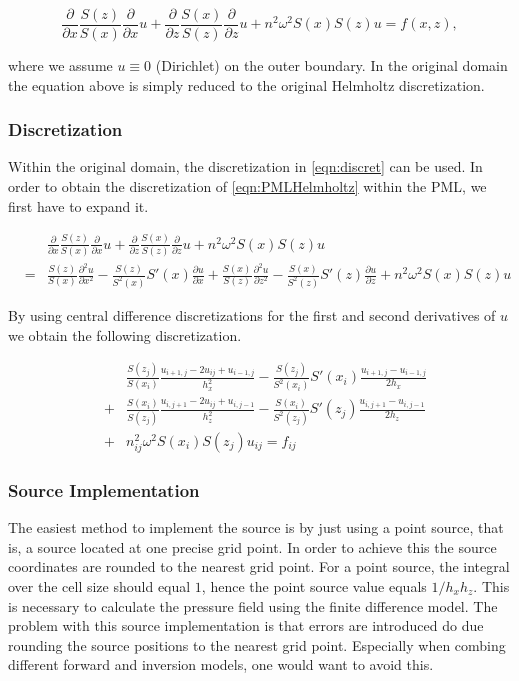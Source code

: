 \documentclass[10pt,a4paper]{article}
\begin{document}
\begin{equation} \label{eqn:PMLHelmholtz}
\frac{\partial }{\partial x}\frac{S(z)}{S(x)}\frac{\partial }{\partial x}u + \frac{\partial }{\partial z}\frac{S(x)}{S(z)}\frac{\partial }{\partial z}u + n^2\omega^2 S(x)S(z)u=f(x,z),
\end{equation}

where we assume $u\equiv 0$ (Dirichlet) on the outer boundary. In the original domain the equation above is simply reduced to the original Helmholtz discretization.

\subsubsection{Discretization}
Within the original domain, the discretization in \cref{eqn:discret} can be used. In order to obtain the discretization of \cref{eqn:PMLHelmholtz} within the PML, we first have to expand it. 

\begin{eqnarray}
&& \frac{\partial }{\partial x}\frac{S(z)}{S(x)}\frac{\partial }{\partial x}u + \frac{\partial }{\partial z}\frac{S(x)}{S(z)}\frac{\partial }{\partial z}u + n^2\omega^2 S(x)S(z)u\\
&=& \frac{S(z)}{S(x)}\frac{\partial^2 u}{\partial x^2}-\frac{S(z)}{S^2(x)}S'(x)\frac{\partial u}{\partial x} + \frac{S(x)}{S(z)}\frac{\partial^2 u}{\partial z^2}-\frac{S(x)}{S^2(z)}S'(z)\frac{\partial u}{\partial z}+ n^2\omega^2 S(x)S(z)u
\end{eqnarray}

By using central difference discretizations for the first and second derivatives of $u$ we obtain the following discretization.

\begin{eqnarray}
&&\frac{S(z_j)}{S(x_i)}\frac{u_{i+1,j}-2u_{ij}+u_{i-1,j}}{h_x^2}-\frac{S(z_j)}{S^2(x_i)}S'(x_i)\frac{u_{i+1,j}-u_{i-1,j}}{2h_x}\\
&+& \frac{S(x_i)}{S(z_j)}\frac{u_{i,j+1}-2u_{ij}+u_{i,j-1}}{h_z^2}-\frac{S(x_i)}{S^2(z_j)}S'(z_j)\frac{u_{i,j+1}-u_{i,j-1}}{2h_z}\\
&+& n_{ij}^2\omega^2 S(x_i)S(z_j)u_{ij}=f_{ij}
\end{eqnarray}

\subsubsection{Source Implementation}
The easiest method to implement the source is by just using a point source, that is, a source located at one precise grid point. In order to achieve this the source coordinates are rounded to the nearest grid point. For a point source, the integral over the cell size should equal $1$, hence the point source value equals $1/h_xh_z$. This is necessary to calculate the pressure field using the finite difference model. The problem with this source implementation is that errors are introduced do due rounding the source positions to the nearest grid point. Especially when combing different forward and inversion models, one would want to avoid this.\\
\end{document}
